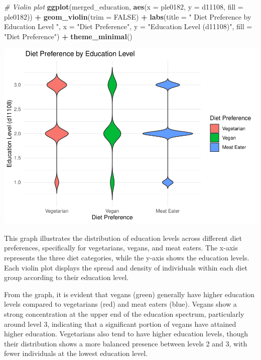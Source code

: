 \documentclass[
]{article}
\newenvironment{Shaded}{\begin{snugshade}}{\end{snugshade}}
\newcommand{\AttributeTok}[1]{\textcolor[rgb]{0.13,0.29,0.53}{#1}}
\newcommand{\CommentTok}[1]{\textcolor[rgb]{0.56,0.35,0.01}{\textit{#1}}}
\newcommand{\ConstantTok}[1]{\textcolor[rgb]{0.56,0.35,0.01}{#1}}
\newcommand{\FunctionTok}[1]{\textcolor[rgb]{0.13,0.29,0.53}{\textbf{#1}}}
\newcommand{\NormalTok}[1]{#1}
\newcommand{\SpecialCharTok}[1]{\textcolor[rgb]{0.81,0.36,0.00}{\textbf{#1}}}
\newcommand{\StringTok}[1]{\textcolor[rgb]{0.31,0.60,0.02}{#1}}
\begin{document}
\begin{Shaded}
\begin{Highlighting}[]
\CommentTok{\# Violin plot}
\FunctionTok{ggplot}\NormalTok{(merged\_education, }\FunctionTok{aes}\NormalTok{(}\AttributeTok{x =}\NormalTok{ ple0182, }\AttributeTok{y =}\NormalTok{ d11108, }\AttributeTok{fill =}\NormalTok{ ple0182)) }\SpecialCharTok{+}
  \FunctionTok{geom\_violin}\NormalTok{(}\AttributeTok{trim =} \ConstantTok{FALSE}\NormalTok{) }\SpecialCharTok{+}
  \FunctionTok{labs}\NormalTok{(}\AttributeTok{title =} \StringTok{" Diet Preference by Education Level "}\NormalTok{,}
       \AttributeTok{x =} \StringTok{"Diet Preference"}\NormalTok{,}
       \AttributeTok{y =} \StringTok{"Education Level (d11108)"}\NormalTok{,}
       \AttributeTok{fill =} \StringTok{"Diet Preference"}\NormalTok{) }\SpecialCharTok{+}
  \FunctionTok{theme\_minimal}\NormalTok{()}
\end{Highlighting}
\end{Shaded}

\includegraphics{Final-v2_files/figure-latex/Education~analysis-1.pdf}

This graph illustrates the distribution of education levels across
different diet preferences, specifically for vegetarians, vegans, and
meat eaters. The x-axis represents the three diet categories, while the
y-axis shows the education levels. Each violin plot displays the spread
and density of individuals within each diet group according to their
education level.

From the graph, it is evident that vegans (green) generally have higher
education levels compared to vegetarians (red) and meat eaters (blue).
Vegans show a strong concentration at the upper end of the education
spectrum, particularly around level 3, indicating that a significant
portion of vegans have attained higher education. Vegetarians also tend
to have higher education levels, though their distribution shows a more
balanced presence between levels 2 and 3, with fewer individuals at the
lowest education level.
\end{document}
